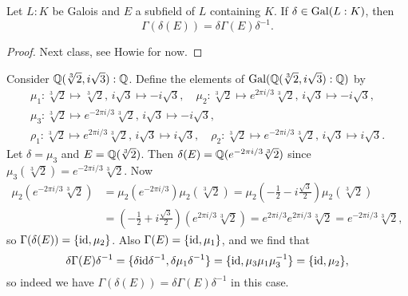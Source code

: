 \begin{theorem}
  Let $L : K$ be Galois and $E$ a subfield of $L$
  containing $K$. If $\delta \in \operatorname{Gal}(L : K)$, then
  \[\Gamma(\delta(E)) = \delta \Gamma(E) \delta^{-1}.\]
\end{theorem}

\begin{proof}
  Next class, see Howie for now.
\end{proof}

\begin{example}
  Consider $\mathbb{Q}(\sqrt[3]{2}, i\sqrt{3}) : \mathbb{Q}$.
  Define the elements of $\operatorname{Gal}(\mathbb{Q}(\sqrt[3]{2}, i\sqrt{3}) : \mathbb{Q})$ by
  \begin{gather*}
    \mu_1 : \sqrt[3]{2} \mapsto \sqrt[3]{2},\, i\sqrt{3} \mapsto -i\sqrt{3}, \quad
    \mu_2 : \sqrt[3]{2} \mapsto e^{2\pi i / 3} \sqrt[3]{2},\, i\sqrt{3} \mapsto -i\sqrt{3}, \\
    \mu_3 : \sqrt[3]{2} \mapsto e^{-2\pi i / 3}\sqrt[3]{2},\, i\sqrt{3} \mapsto -i\sqrt{3}, \\
    \rho_1 : \sqrt[3]{2} \mapsto e^{2\pi i / 3}\sqrt[3]{2},\, i\sqrt{3} \mapsto i\sqrt{3}, \quad
    \rho_2 : \sqrt[3]{2} \mapsto e^{-2\pi i / 3}\sqrt[3]{2},\, i\sqrt{3} \mapsto i\sqrt{3}.
  \end{gather*}
  Let $\delta = \mu_3$ and $E = \mathbb{Q}(\sqrt[3]{2})$.
  Then $\delta(E) = \mathbb{Q}(e^{-2\pi i / 3}\sqrt[3]{2})$ since
  $\mu_3(\sqrt[3]{2}) = e^{-2\pi i / 3}\sqrt[3]{2}$. Now
  \begin{align*}
    \mu_2(e^{-2\pi i / 3} \sqrt[3]{2})
    &= \mu_2(e^{-2\pi i / 3}) \mu_2(\sqrt[3]{2})
    = \mu_2(-\frac{1}{2} - i\frac{\sqrt{3}}{2}) \mu_2(\sqrt[3]{2}) \\
    &= (-\frac{1}{2} + i\frac{\sqrt{3}}{{2}})(e^{2\pi i / 3} \sqrt[3]{2})
    = e^{2\pi i / 3} e^{2\pi i / 3} \sqrt[3]{2}
    = e^{-2\pi i / 3} \sqrt[3]{2},
  \end{align*}
  so $\Gamma(\delta(E)) = \{\mathrm{id}, \mu_2\}$. Also
  $\Gamma(E) = \{\mathrm{id}, \mu_1\}$, and we find that
  \[
    \delta \Gamma(E) \delta^{-1}
    = \{\delta \mathrm{id} \delta^{-1}, \delta \mu_1 \delta^{-1}\}
    = \{\mathrm{id}, \mu_3 \mu_1 \mu_3^{-1}\} = \{\mathrm{id}, \mu_2\},
  \]
  so indeed we have $\Gamma(\delta(E)) = \delta \Gamma(E) \delta^{-1}$ in this case.
\end{example}
